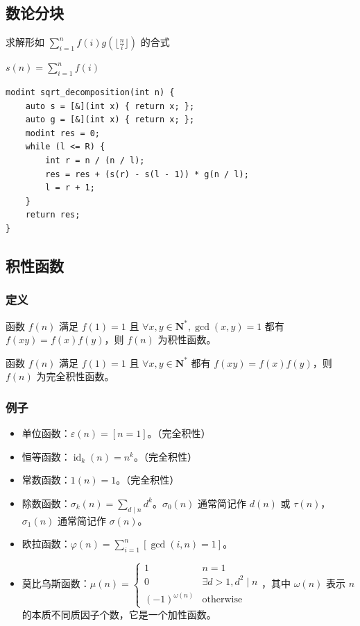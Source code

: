 \documentclass[UTF8]{ctexart}
\begin{document}
\begin{sloppypar}
\subsection{数论分块}

求解形如 $\sum_{i=1}^{n}f(i)g(\lfloor\frac{n}{i}\rfloor)$ 的合式

$s(n) = \sum_{i=1}^{n}f(i)$

\begin{lstlisting}[style=cpp]
modint sqrt_decomposition(int n) {
    auto s = [&](int x) { return x; };
    auto g = [&](int x) { return x; };
    modint res = 0;
    while (l <= R) {
        int r = n / (n / l);
        res = res + (s(r) - s(l - 1)) * g(n / l);
        l = r + 1;
    }
    return res;
}
\end{lstlisting}

\subsection{积性函数}

\subsubsection{定义}

函数 $f(n)$ 满足 $f(1)=1$ 且 $\forall x,y\in\mathbf{N}^*,\gcd(x,y)=1$ 都有 $f(xy)=f(x)f(y)$，则 $f(n)$ 为积性函数。

函数 $f(n)$ 满足 $f(1)=1$ 且 $\forall x,y\in\mathbf{N}^*$ 都有 $f(xy)=f(x)f(y)$，则 $f(n)$ 为完全积性函数。

\subsubsection{例子}

\begin{itemize}
   \item 单位函数：$\varepsilon(n)=[n=1]$。（完全积性）
   \item 恒等函数：$\operatorname{id}_k(n)=n^k$。（完全积性）
   \item 常数函数：$1(n)=1$。（完全积性）
   \item 除数函数：$\sigma_{k}(n)=\sum_{d\mid n}d^{k}$。$\sigma_{0}(n)$ 通常简记作 $d(n)$ 或 $\tau(n)$，$\sigma_{1}(n)$ 通常简记作 $\sigma(n)$。
   \item 欧拉函数：$\varphi(n)=\sum_{i=1}^n[\gcd(i,n)=1]$。
   \item 莫比乌斯函数：$\mu(n)=\begin{cases}1&n=1\\0&\exists d>1,d^{2}\mid n\\(-1)^{\omega(n)}&\text{otherwise}\end{cases}$，其中 $\omega(n)$ 表示 $n$ 的本质不同质因子个数，它是一个加性函数。
\end{itemize}


\end{sloppypar}
\end{document}
